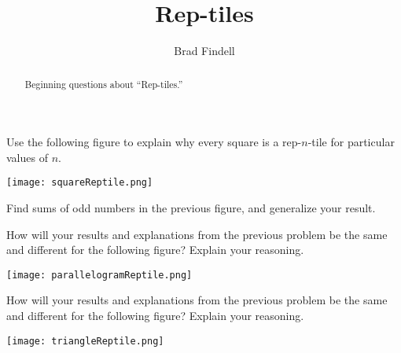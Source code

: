 \documentclass[nooutcomes]{ximera}
\title{Rep-tiles}
\author{Brad Findell}
\begin{document}
\begin{abstract}
Beginning questions about ``Rep-tiles.'' 
\end{abstract}
\maketitle


\begin{problem}
Use the following figure to explain why every square is a rep-$n$-tile for particular values of $n$.
\begin{image}
\texttt{[image: squareReptile.png]}
\end{image}
\end{problem}

\begin{problem}
Find sums of odd numbers in the previous figure, and generalize your result.  
\vfill
\end{problem}

\newpage
\begin{problem}
How will your results and explanations from the previous problem be the same and different for the following figure?  Explain your reasoning. 
\begin{image}
\texttt{[image: parallelogramReptile.png]}
\end{image}
\vfill
\end{problem}

\begin{problem}
How will your results and explanations from the previous problem be the same and different for the following figure?  Explain your reasoning. 
\begin{image}
\texttt{[image: triangleReptile.png]}
\end{image}
\vfill
\end{problem}
\end{document}
